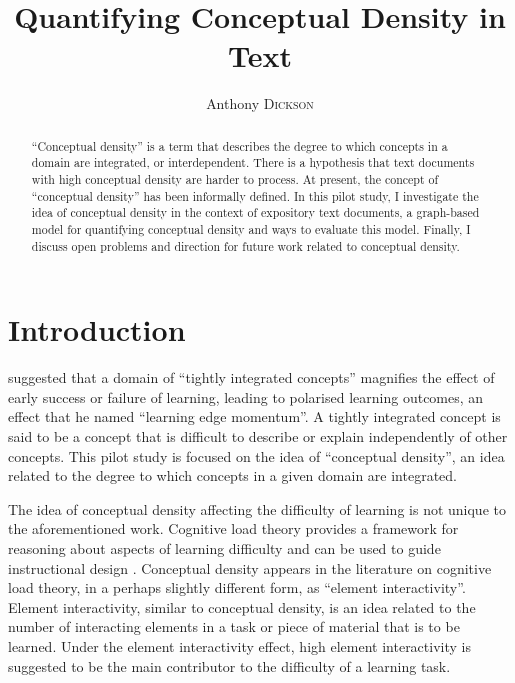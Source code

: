 \documentclass[12pt]{article}
\title{Quantifying Conceptual Density in Text}
\author{Anthony \textsc{Dickson}}
\theoremstyle{grammarstyle}
\begin{document}
\maketitle

\tableofcontents
\clearpage

\begin{abstract}
    ``Conceptual density'' is a term that describes the degree to which concepts in a domain are integrated, or interdependent.
    There is a hypothesis that text documents with high conceptual density are harder to process.
    At present, the concept of ``conceptual density'' has been informally defined.
    In this pilot study, I investigate the idea of conceptual density in the context of expository text documents, a graph-based model for quantifying conceptual density and ways to evaluate this model. Finally, I discuss open problems and direction for future work related to conceptual density.
\end{abstract}


\section{Introduction}
\cite{robins2010learning} suggested that a domain of ``tightly integrated concepts'' magnifies the effect of early success or failure of learning, leading to polarised learning outcomes, an effect that he named ``learning edge momentum''. A tightly integrated concept is said to be a concept that is difficult to describe or explain independently of other concepts. This pilot study is focused on the idea of ``conceptual density'', an idea related to the degree to which concepts in a given domain are integrated.


The idea of conceptual density affecting the difficulty of learning is not unique to the aforementioned work. Cognitive load theory provides a framework for reasoning about aspects of learning difficulty and can be used to guide instructional design \citep{sweller1994cognitive}. Conceptual density appears in the literature on cognitive load theory, in a perhaps slightly different form, as ``element interactivity''. Element interactivity, similar to conceptual density, is an idea related to the number of interacting elements in a task or piece of material that is to be learned. Under the element interactivity effect, high element interactivity is suggested to be the main contributor to the difficulty of a learning task.
\end{document}
